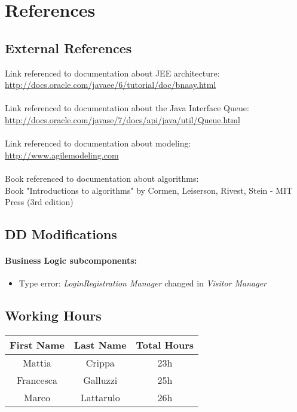 \chapter{References} \label{chap6}
\section{External References}
Link referenced to documentation about JEE architecture:\\
\href{http://docs.oracle.com/javaee/6/tutorial/doc/bnaay.html} {http://docs.oracle.com/javaee/6/tutorial/doc/bnaay.html} \\ \\
Link referenced to documentation about the Java Interface Queue:\\
\href{http://docs.oracle.com/javase/7/docs/api/java/util/Queue.html} {http://docs.oracle.com/javase/7/docs/api/java/util/Queue.html} \\ \\
Link referenced to documentation about modeling:\\
\href{http://www.agilemodeling.com} {http://www.agilemodeling.com} \\ \\
Book referenced to documentation about algorithms:\\
Book "Introductions to algorithms" by Cormen, Leiserson, Rivest, Stein - MIT Press (3rd edition)

\section{DD Modifications}
\subsubsection{Business Logic subcomponents:}
\begin{itemize}
	\item Type error: \textit{Login\/Registration Manager} changed in \textit{Visitor Manager}
\end{itemize}
\clearpage

\section{Working Hours}

\begin{table}[htbp]
\begin{center}
\begin{tabular}[t]{ccc}

\hline
\textbf{First Name} & \textbf{Last Name} & \textbf{Total Hours} \\
\hline
Mattia & Crippa &  23h\\
\hline
Francesca & Galluzzi &  25h\\
\hline
Marco & Lattarulo & 26h\\
\hline

\end{tabular}
\end{center}
\end{table}
